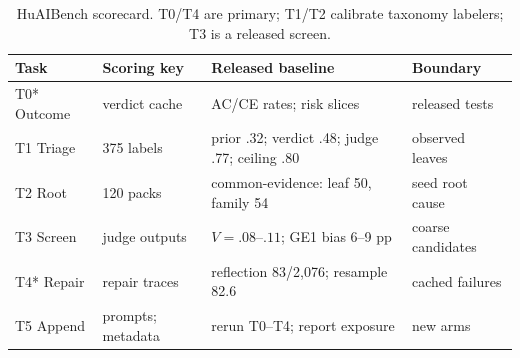 \documentclass[conference]{IEEEtran}
\begin{document}
\begin{table}[t]
\centering
\caption{HuAIBench scorecard. T0/T4 are primary; T1/T2 calibrate taxonomy labelers;
T3 is a released screen.}
\label{tab:claimcal}
\scriptsize
\setlength{\tabcolsep}{1.5pt}
\begin{tabular}{p{}p{}p{}p{}}
\toprule
Task & Scoring key & Released baseline & Boundary\\
\midrule
T0* Outcome & verdict cache & AC/CE rates; risk slices & released tests\\
T1 Triage & 375 labels & prior .32; verdict .48; judge .77; ceiling .80 & observed leaves\\
T2 Root & 120 packs & common-evidence: leaf 50, family 54 & seed root cause\\
T3 Screen & judge outputs & $V=.08$--$.11$; GE1 bias 6--9 pp & coarse candidates\\
T4* Repair & repair traces & reflection 83/2{,}076; resample 82.6 & cached failures\\
T5 Append & prompts; metadata & rerun T0--T4; report exposure & new arms\\
\bottomrule
\end{tabular}
\end{table}
\end{document}

